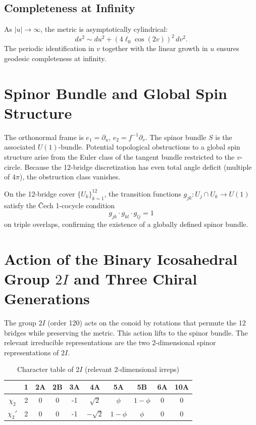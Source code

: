\documentclass[11pt,a4paper]{article}
\begin{document}
\subsection{Completeness at Infinity}

As \(|u| \to \infty\), the metric is asymptotically cylindrical:
\[
ds^2 \sim du^2 + (4\ell_0 \cos(2v))^2 \, dv^2.
\]
The periodic identification in \(v\) together with the linear growth in \(u\) ensures geodesic completeness at infinity.

\section{Spinor Bundle and Global Spin Structure}

The orthonormal frame is \(e_1 = \partial_u\), \(e_2 = f^{-1}\partial_v\). The spinor bundle \(S\) is the associated \(U(1)\)-bundle. Potential topological obstructions to a global spin structure arise from the Euler class of the tangent bundle restricted to the \(v\)-circle. Because the 12-bridge discretization has even total angle deficit (multiple of \(4\pi\)), the obstruction class vanishes.

On the 12-bridge cover \(\{U_k\}_{k=1}^{12}\), the transition functions \(g_{jk}: U_j \cap U_k \to U(1)\) satisfy the Čech 1-cocycle condition
\[
g_{jk} \cdot g_{kl} \cdot g_{lj} = 1
\]
on triple overlaps, confirming the existence of a globally defined spinor bundle.

\section{Action of the Binary Icosahedral Group \(2I\) and Three Chiral Generations}

The group \(2I\) (order 120) acts on the conoid by rotations that permute the 12 bridges while preserving the metric. This action lifts to the spinor bundle. The relevant irreducible representations are the two 2-dimensional spinor representations of \(2I\).

\begin{table}[h]
\centering
\caption{Character table of \(2I\) (relevant 2-dimensional irreps)}
\begin{tabular}{c|ccccccccc}
 & 1 & 2A & 2B & 3A & 4A & 5A & 5B & 6A & 10A \\ \hline
\(\chi_2\) & 2 & 0 & 0 & -1 & \(\sqrt{2}\) & \(\phi\) & \(1-\phi\) & 0 & 0 \\
\(\chi_2'\) & 2 & 0 & 0 & -1 & \(-\sqrt{2}\) & \(1-\phi\) & \(\phi\) & 0 & 0 \\
\end{tabular}
\end{table}
\end{document}
